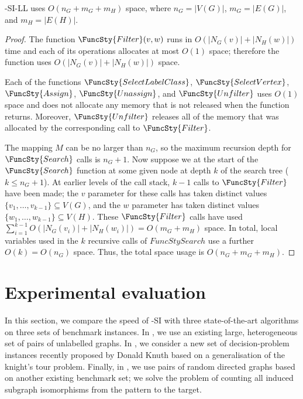 \begin{proposition}\label{mcsplit-si-space}
    \McSplit-SI-LL uses $O(n_G + m_G + m_H)$ space, where
    $n_G=|V(G)|$,
    $m_G=|E(G)|$, and
    $m_H=|E(H)|$.
\end{proposition}

\begin{proof}
    The function $\FuncSty{Filter}(v,w)$ runs in $O(|N_G(v)| + |N_H(w)|)$ time
    and each of its operations allocates at most $O(1)$ space; therefore the
    function uses $O(|N_G(v)| + |N_H(w)|)$ space.

    Each of the functions
    $\FuncSty{SelectLabelClass}$,
    $\FuncSty{SelectVertex}$,
    $\FuncSty{Assign}$,
    $\FuncSty{Unassign}$,
    and
    $\FuncSty{Unfilter}$
    uses $O(1)$ space and does not allocate any memory that is not released
    when the function returns.  Moreover, $\FuncSty{Unfilter}$ releases
    all of the memory that was allocated by the corresponding call to $\FuncSty{Filter}$.

    The mapping $M$ can be no larger than $n_G$, so the maximum recursion depth for
    $\FuncSty{Search}$ calls is $n_G + 1$.  Now suppose we at the start of the
    $\FuncSty{Search}$ function at some given node at depth $k$ of the search tree 
    ($k \leq n_G + 1$).  At earlier levels of the call stack, $k-1$ calls to $\FuncSty{Filter}$
    have been made; the $v$ parameter for these calls has taken distinct values
    $\{v_1, \dots, v_{k-1}\} \subseteq V(G)$, and the $w$ parameter has taken distinct values
    $\{w_1, \dots, w_{k-1}\} \subseteq V(H)$.  These $\FuncSty{Filter}$ calls have used
    $\sum_{i=1}^{k-1} O(|N_G(v_i)| + |N_H(w_i)|) = O(m_G + m_H)$ space.  In total,
    local variables used in the $k$
    recursive calls of $FuncSty{Search}$ use a further $O(k) = O(n_G)$ space.  Thus,
    the total space usage is $O(n_G + m_G + m_H)$.
\end{proof}

\section{Experimental evaluation}\label{sec:mcsplit-si-experiments}
\label{sec:si-experiments}

In this section, we compare the speed of \McSplit-SI with three state-of-the-art algorithms
on three sets of benchmark instances.  In ,
we use an existing large, heterogeneous set of pairs of unlabelled
graphs.
In ,
we consider a new set of decision-problem
instances recently proposed by Donald Knuth based on a generalisation of the knight's
tour problem.
Finally, in , we use pairs of random directed
graphs based on another existing benchmark set;
we solve the problem of counting all induced subgraph isomorphisms from the pattern to the target.

